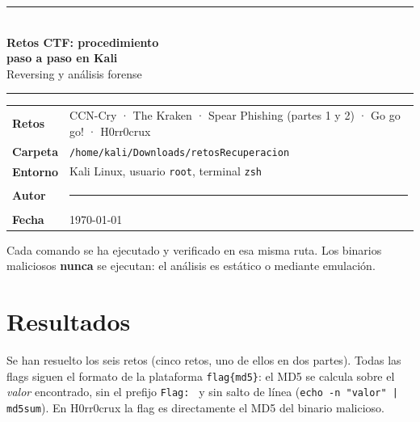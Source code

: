 \documentclass[11pt,a4paper]{article}
\newcommand{\autor}{\rule{6cm}{0.4pt}}  %
\begin{document}
\begin{titlepage}
\centering
\vspace*{2cm}
{\color{titulo}\rule{\linewidth}{1.2pt}\\[0.6cm]
{\Huge\bfseries Retos CTF: procedimiento\\[0.25cm] paso a paso en Kali}\\[0.4cm]
{\Large Reversing y análisis forense}\\[0.4cm]
\rule{\linewidth}{1.2pt}}
\vspace{1.5cm}

\begin{tcolorbox}[enhanced, colback=gray!4, colframe=titulo, boxrule=0.6pt, arc=3pt, width=0.88\linewidth]
\begin{tabularx}{\linewidth}{@{}lX@{}}
\textbf{Retos} & CCN-Cry · The Kraken · Spear Phishing (partes 1 y 2) · Go go go! · H0rr0crux \\[2pt]
\textbf{Carpeta} & \texttt{/home/kali/Downloads/retosRecuperacion} \\[2pt]
\textbf{Entorno} & Kali Linux, usuario \texttt{root}, terminal \texttt{zsh} \\[2pt]
\textbf{Autor} & \autor \\[2pt]
\textbf{Fecha} & \today \\
\end{tabularx}
\end{tcolorbox}

\vfill
{\small Cada comando se ha ejecutado y verificado en esa misma ruta. Los binarios maliciosos \textbf{nunca} se
ejecutan: el análisis es estático o mediante emulación.}
\end{titlepage}

\section*{Resultados}


Se han resuelto los seis retos (cinco retos, uno de ellos en dos partes). Todas las flags siguen el
formato de la plataforma \texttt{flag\{md5\}}: el MD5 se calcula sobre el \emph{valor} encontrado, sin el prefijo
\texttt{Flag:~} y sin salto de línea (\texttt{echo -n "valor" | md5sum}). En H0rr0crux la flag es directamente el
MD5 del binario malicioso.
\end{document}
